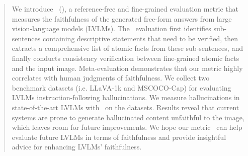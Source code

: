 \begin{abstract}
We introduce \ours\ (\ourslong), a reference-free and fine-grained evaluation metric that measures the faithfulness of the generated free-form answers from large vision-language models (LVLMs). The \ours\ evaluation first identifies sub-sentences containing descriptive statements that need to be verified, then extracts a comprehensive list of atomic facts from these sub-sentences, and finally conducts consistency verification between fine-grained atomic facts and the input image. Meta-evaluation demonstrates that our metric highly correlates with human judgments of faithfulness.  We collect two benchmark datasets  (i.e. LLaVA-1k and MSCOCO-Cap) for evaluating LVLMs instruction-following hallucinations.
We measure hallucinations in state-of-the-art LVLMs with \ours\ on the datasets. Results reveal that current systems are prone to generate hallucinated content unfaithful to the image, which leaves room for future improvements.  We hope our metric \ours\ can help evaluate future LVLMs in terms of faithfulness and provide insightful advice for enhancing LVLMs' faithfulness. 
\end{abstract}
